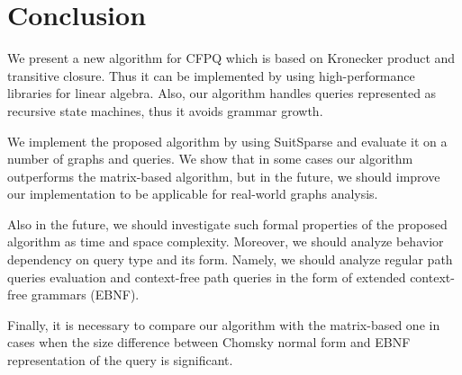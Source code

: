 \section{Conclusion}

We present a new algorithm for CFPQ which is based on Kronecker product and transitive closure.
Thus it can be implemented by using high-performance libraries for linear algebra. Also, our algorithm handles queries represented as recursive state machines, thus it avoids grammar growth.

We implement the proposed algorithm by using SuitSparse and evaluate it on a number of graphs and queries.
We show that in some cases our algorithm outperforms the matrix-based algorithm, but in the future, we should improve our implementation to be applicable for real-world graphs analysis. 

Also in the future, we should investigate such formal properties of the proposed algorithm as time and space complexity.
Moreover, we should analyze behavior dependency on query type and its form. Namely, we should analyze regular path queries evaluation and context-free path queries in the form of extended context-free grammars (EBNF).

Finally, it is necessary to compare our algorithm with the matrix-based one in cases when the size difference between Chomsky normal form and EBNF representation of the query is significant.